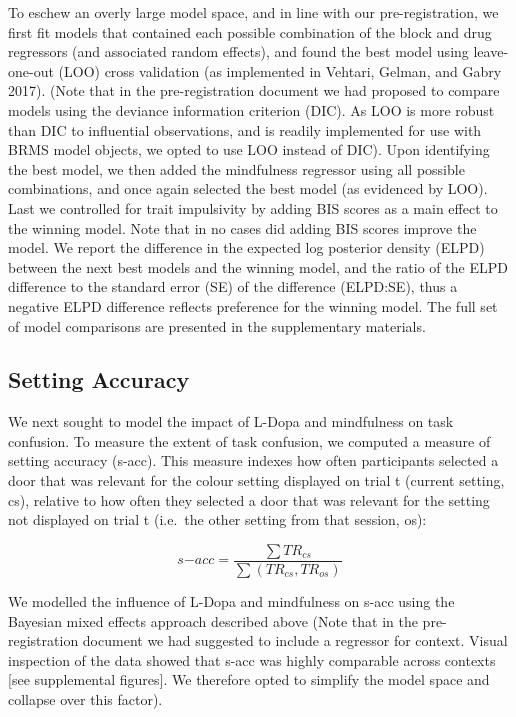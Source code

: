 \documentclass{article}
\begin{document}
To eschew an overly large model space, and in line with our
pre-registration, we first fit models that contained each possible
combination of the block and drug regressors (and associated random
effects), and found the best model using leave-one-out (LOO) cross
validation (as implemented in Vehtari, Gelman, and Gabry 2017). (Note
that in the pre-registration document we had proposed to compare models
using the deviance information criterion (DIC). As LOO is more robust
than DIC to influential observations, and is readily implemented for use
with BRMS model objects, we opted to use LOO instead of DIC). Upon
identifying the best model, we then added the mindfulness regressor
using all possible combinations, and once again selected the best model
(as evidenced by LOO). Last we controlled for trait impulsivity by
adding BIS scores as a main effect to the winning model. Note that in no
cases did adding BIS scores improve the model. We report the difference
in the expected log posterior density (ELPD) between the next best
models and the winning model, and the ratio of the ELPD difference to
the standard error (SE) of the difference (ELPD:SE), thus a negative
ELPD difference reflects preference for the winning model. The full set
of model comparisons are presented in the supplementary materials.

\hypertarget{setting-accuracy}{%
\subsection{Setting Accuracy}\label{setting-accuracy}}

We next sought to model the impact of L-Dopa and mindfulness on task
confusion. To measure the extent of task confusion, we computed a
measure of setting accuracy (s-acc). This measure indexes how often
participants selected a door that was relevant for the colour setting
displayed on trial t (current setting, cs), relative to how often they
selected a door that was relevant for the setting not displayed on trial
t (i.e.~the other setting from that session, os):

\[
s\mathrm{-}acc = \frac{\sum{TR_{cs}}}{\sum{(TR_{cs}, TR_{os})}}
\]

We modelled the influence of L-Dopa and mindfulness on s-acc using the
Bayesian mixed effects approach described above (Note that in the
pre-registration document we had suggested to include a regressor for
context. Visual inspection of the data showed that s-acc was highly
comparable across contexts {[}see supplemental figures{]}. We therefore
opted to simplify the model space and collapse over this factor).
\end{document}
